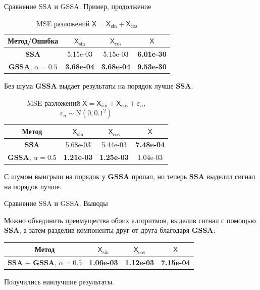 \documentclass[notheorems, handout]{beamer}
\newcommand{\SSA}{\textbf{SSA}}
\newcommand{\GSSA}{\textbf{GSSA}}
\newcommand{\TS}{\mathsf{X}}
\begin{document}
	
	\begin{frame}{Сравнение SSA и GSSA. Пример, продолжение}
		\begin{table}[H]
			\caption{MSE разложений $\TS = \TS_{\sin} + \TS_{\cos}$}
			\centering
			\begin{tabular}{c|ccc}
				\hline
				Метод/Ошибка & $\TS_{\sin}$ & $\TS_{\cos}$ & $\TS$ \\ 
				\hline
				$\SSA$   & 5.15e-03 & 5.15e-03 & \textbf{6.01e-30}\\ 
				$\GSSA$, $\alpha = 0.5$  & \textbf{3.68e-04} & \textbf{3.68e-04} & \textbf{9.53e-30} \\ 
				\hline
			\end{tabular}
			\label{tab:mse_ssa_gssa}
		\end{table}
		Без шума $\GSSA$ выдает результаты на порядок лучше $\SSA$.

		\begin{table}[H]
			\caption{MSE разложений $\TS = \TS_{\sin} + \TS_{\cos}+
		\varepsilon_n$, $\varepsilon_n \sim \mathrm N(0, 0.1^2)$ }
			\centering
			\begin{tabular}{c|ccc}
				\hline
				Метод & $\TS_{\sin}$ & $\TS_{\cos}$ & $\TS$ \\ 
				\hline
				$\SSA$      & 5.68e-03 & 5.44e-03 & \textbf{7.48e-04}  \\ 
				$\GSSA$, $\alpha = 0.5$ & \textbf{1.21e-03} & \textbf{1.25e-03} & 1.04e-03 \\
				\hline
			\end{tabular}
			\label{tab:errs_ssa_gssa}
		\end{table}
		С шумом выигрыш на порядок у $\GSSA$ пропал, но теперь $\SSA$ выделил сигнал на порядок лучше.

	\end{frame}
	
	
	
	\begin{frame}{Сравнение SSA и GSSA. Выводы}

		Можно объединить преимущества обоих алгоритмов, выделив сигнал с помощью $\SSA$, а затем разделив компоненты друг от друга благодаря $\GSSA$:
		\begin{table}[H]
			\label{tab:errs_ssa_gssa_united}
			\centering
			\begin{tabular}{c|ccc}
				\hline
				Метод & $\TS_{\sin}$ & $\TS_{\cos}$ & $\TS$ \\ 
				\hline
				$\SSA$ + $\GSSA$, $\alpha = 0.5$ & \textbf{1.06e-03} & \textbf{1.12e-03} & \textbf{7.15e-04} \\ 
				\hline
			\end{tabular}
		\end{table}

		Получились наилучшие результаты.
	\end{frame}
	
\end{document}
